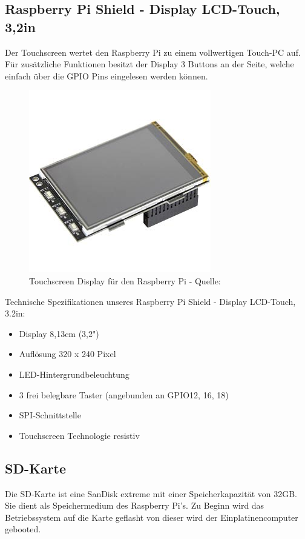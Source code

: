 \documentclass[a4paper,11pt,singlespacing]{article}
\begin{document}
			\subsection{Raspberry Pi Shield - Display LCD-Touch, 3,2in}
				Der Touchscreen wertet den Raspberry Pi zu einem vollwertigen Touch-PC auf. Für zusätzliche Funktionen besitzt der Display 3 Buttons an der Seite, welche einfach über die GPIO Pins eingelesen werden können.
				\begin{figure}[H]
					\centering
					\includegraphics[scale=0.5]{touch_display}
					\caption{Touchscreen Display für den Raspberry Pi - Quelle: \cite{Picture_touchdisplay}}
					\label{touchdisplay}
				\end{figure}
				Technische Spezifikationen unseres Raspberry Pi Shield - Display LCD-Touch, 3.2in:
				\begin{itemize}
					\item Display 8,13cm (3,2")
					\item Auflösung 320 x 240 Pixel
					\item LED-Hintergrundbeleuchtung
					\item 3 frei belegbare Taster (angebunden an GPIO12, 16, 18)
					\item SPI-Schnittstelle
					\item Touchscreen Technologie resistiv
				\end{itemize}
			\subsection{SD-Karte}
    			Die SD-Karte ist eine SanDisk extreme mit einer Speicherkapazität von 32GB. Sie dient als Speichermedium des Raspberry Pi's. Zu Beginn wird das Betriebssystem auf die Karte geflasht von dieser wird der Einplatinencomputer gebooted.
\end{document}
